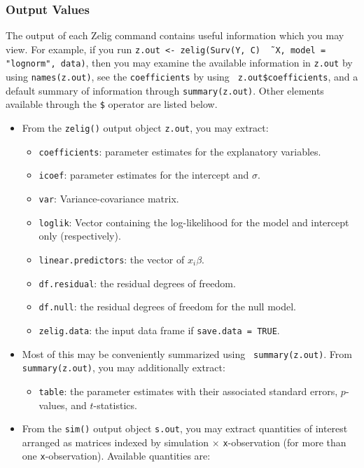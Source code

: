 \subsubsection{Output Values}

The output of each Zelig command contains useful information which you
may view.  For example, if you run \texttt{z.out <- zelig(Surv(Y,
  C) \~\, X, model = "lognorm", data)}, then you may examine the
available information in \texttt{z.out} by using
\texttt{names(z.out)}, see the {\tt coefficients} by using {\tt
  z.out\$coefficients}, and a default summary of information
through \texttt{summary(z.out)}.  Other elements available through
the {\tt \$} operator are listed below.

\begin{itemize}
\item From the {\tt zelig()} output object {\tt z.out}, you may extract:
   \begin{itemize}
   \item {\tt coefficients}: parameter estimates for the explanatory
     variables.
   \item {\tt icoef}: parameter estimates for the intercept and $\sigma$.  
   \item {\tt var}: Variance-covariance matrix.  
   \item {\tt loglik}: Vector containing the log-likelihood for the
     model and intercept only (respectively).
   \item {\tt linear.predictors}: the vector of
     $x_{i}\beta$.
   \item {\tt df.residual}: the residual degrees of freedom.
   \item {\tt df.null}: the residual degrees of freedom for the null
     model.
   \item {\tt zelig.data}: the input data frame if {\tt save.data = TRUE}.  
   \end{itemize}

\item Most of this may be conveniently summarized using {\tt
   summary(z.out)}.  From {\tt summary(z.out)}, you may
 additionally extract: 
   \begin{itemize}
   \item {\tt table}: the parameter estimates with their
     associated standard errors, $p$-values, and $t$-statistics.
   \end{itemize}

\item From the {\tt sim()} output object {\tt s.out}, you may extract
  quantities of interest arranged as matrices indexed by simulation
  $\times$ {\tt x}-observation (for more than one {\tt x}-observation).
  Available quantities are:


\end{itemize}
